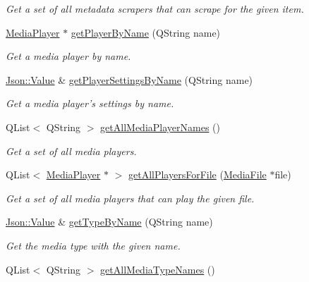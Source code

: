 \begin{DoxyCompactItemize}
\begin{DoxyCompactList}\small\item\em Get a set of all metadata scrapers that can scrape for the given item. \end{DoxyCompactList}\item 
\hyperlink{class_a_w_e_1_1_media_player}{Media\-Player} $\ast$ \hyperlink{class_a_w_e_1_1_global_settings_a4c721bc8ac90e3fc47745e8130de4ebb}{get\-Player\-By\-Name} (Q\-String name)
\begin{DoxyCompactList}\small\item\em Get a media player by name. \end{DoxyCompactList}\item 
\hyperlink{class_json_1_1_value}{Json\-::\-Value} \& \hyperlink{class_a_w_e_1_1_global_settings_a0ef3ccfe51fba30be109584375f1eb6f}{get\-Player\-Settings\-By\-Name} (Q\-String name)
\begin{DoxyCompactList}\small\item\em Get a media player's settings by name. \end{DoxyCompactList}\item 
Q\-List$<$ Q\-String $>$ \hyperlink{class_a_w_e_1_1_global_settings_a70b279b736dc2b9ad4b8b5e13b3433c7}{get\-All\-Media\-Player\-Names} ()
\begin{DoxyCompactList}\small\item\em Get a set of all media players. \end{DoxyCompactList}\item 
Q\-List$<$ \hyperlink{class_a_w_e_1_1_media_player}{Media\-Player} $\ast$ $>$ \hyperlink{class_a_w_e_1_1_global_settings_a166fc2ae091823800ad586e8d6cf5b0a}{get\-All\-Players\-For\-File} (\hyperlink{class_a_w_e_1_1_media_file}{Media\-File} $\ast$file)
\begin{DoxyCompactList}\small\item\em Get a set of all media players that can play the given file. \end{DoxyCompactList}\item 
\hyperlink{class_json_1_1_value}{Json\-::\-Value} \& \hyperlink{class_a_w_e_1_1_global_settings_a6e78425d75670a61252c2af0a80df382}{get\-Type\-By\-Name} (Q\-String name)
\begin{DoxyCompactList}\small\item\em Get the media type with the given name. \end{DoxyCompactList}\item 
Q\-List$<$ Q\-String $>$ \hyperlink{class_a_w_e_1_1_global_settings_a13359a6e477bfdf66441b2c0f912fc34}{get\-All\-Media\-Type\-Names} ()

\end{DoxyCompactItemize}
